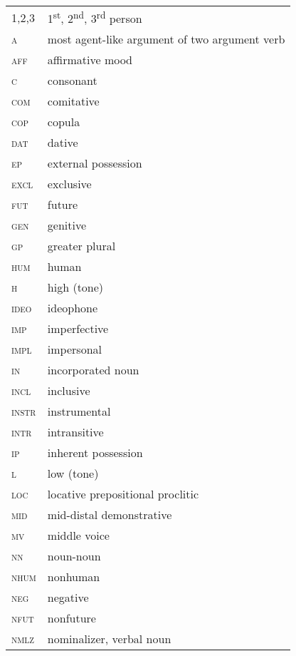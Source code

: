 \documentclass[output=paper]{langsci/langscibook}
\begin{document}
 
\noindent 
\begin{tabularx}{.48\textwidth}{lQ}
1,2,3	&  1\textsuperscript{st}, 2\textsuperscript{nd}, 3\textsuperscript{rd} person \\
\textsc{a}   &  most agent-like argument of two argument verb \\
\textsc{aff}  &   affirmative mood \\
\textsc{c}  &  consonant \\
\textsc{com}   & comitative \\
\textsc{cop}  &  copula \\
\textsc{dat}  &   dative \\
\textsc{ep}  &   external possession \\
\textsc{excl}  &   exclusive \\
\textsc{fut}  &  future \\
\textsc{gen}  &  genitive \\
\textsc{gp}  &  greater plural \\
\textsc{hum}  &  human \\
\textsc{h} &   high (tone) \\
\textsc{ideo} &   ideophone \\
\textsc{imp}  &  imperfective \\
\textsc{impl}  &  impersonal \\
\textsc{in}   &  incorporated noun \\
\textsc{incl }  &  inclusive \\
\textsc{instr }  &  instrumental \\
\textsc{intr}  &   intransitive \\
\textsc{ip}  &  inherent possession \\
\textsc{l}  &  low (tone) \\
\textsc{loc}   &  locative prepositional
proclitic \\
\textsc{mid}  &  mid-distal
demonstrative \\
\textsc{mv}  &   middle voice \\
\textsc{nn}  &  noun-noun \\
\textsc{nhum}  &  nonhuman \\
\textsc{neg}  &   negative \\
\textsc{nfut}  &  nonfuture \\
\textsc{nmlz}   &  nominalizer, verbal noun\\
\end{tabularx}
\end{document}
